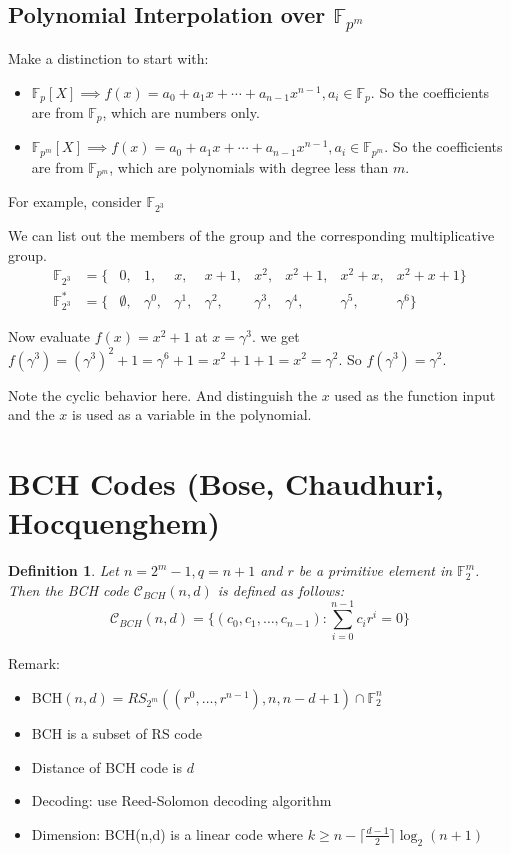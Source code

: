 \documentclass[letterpaper,12pt]{article}
\newtheorem{definition}{Definition}
\begin{document}
\subsection{Polynomial Interpolation over $\mathbb{F}_{p^m}$}
Make a distinction to start with:\begin{itemize}
    \item $\mathbb{F}_p[X] \implies f(x)=a_0+a_1x+\cdots+a_{n-1}x^{n-1}, a_i\in \mathbb{F}_p$. So the coefficients are from $\mathbb{F}_p$, which are numbers only.
    \item $\mathbb{F}_{p^m}[X] \implies f(x)=a_0+a_1x+\cdots+a_{n-1}x^{n-1}, a_i\in \mathbb{F}_{p^m}$. So the coefficients are from $\mathbb{F}_{p^m}$, which are polynomials with degree less than $m$.
\end{itemize}
For example, consider $\mathbb{F}_{2^3}$

We can list out the members of the group and the corresponding multiplicative
group.
\begin{align*}
    \mathbb{F}_{2^3}   & = \{ & 0,         & 1,        & x,        & x+1,      & x^2,      & x^2+1,    & x^2+x,    & x^2+x+1\}  \\
    \mathbb{F}_{2^3}^* & = \{ & \emptyset, & \gamma^0, & \gamma^1, & \gamma^2, & \gamma^3, & \gamma^4, & \gamma^5, & \gamma^6\}
\end{align*}

Now evaluate $f(x)=x^2 +1$ at $x = \gamma^3$. we get
$f(\gamma^3)={(\gamma^3)}^2+1=\gamma^6+1=x^2+1+1=x^2=\gamma^2$. So
$f(\gamma^3)=\gamma^2$.

Note the cyclic behavior here. And distinguish the $x$ used as the function input
and the $x$ is used as a variable in the polynomial.

\section{BCH Codes (Bose, Chaudhuri, Hocquenghem)}
\begin{definition}
    Let $n=2^m-1, q = n + 1$ and $r$ be a primitive element in $\mathbb{F}_2^m$. Then the BCH code $\mathcal{C}_{BCH}(n,d)$ is defined as follows: \[
        \mathcal{C}_{BCH}(n,d)=\{(c_0,c_1,\ldots,c_{n-1}): \sum_{i=0}^{n-1}c_i r^i=0\}
    \]
\end{definition}
Remark: \begin{itemize}
    \item BCH$(n,d)=RS_{2^m}((r^0,\ldots,r^{n-1}),n,n-d+1)\cap \mathbb{F}_2^n$
    \item BCH is a subset of RS code
    \item Distance of BCH code is $d$
    \item Decoding: use Reed-Solomon decoding algorithm
    \item Dimension: BCH(n,d) is a linear code where $k\ge n-\lceil \frac{d-1}{2} \rceil \log_2(n+1)$
\end{itemize}
\end{document}
